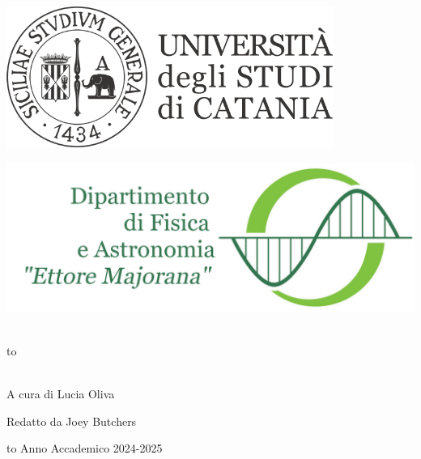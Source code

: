 \documentclass[openany,12pt]{article}
\newcommand\blankpage{%
    \null
    \thispagestyle{empty}%
    \newpage} %
\begin{document}
\thispagestyle{empty}
\begin{center}

\begin{minipage}[c]{0.45\textwidth}
\begin{flushleft}
\includegraphics[width=0.8\textwidth]{logo-unict-orizzontale-grigio.png}
\end{flushleft}
\end{minipage}
\hfill
\begin{minipage}[c]{0.45\textwidth}
\begin{flushright}
\includegraphics[width=\textwidth]{logo_dfa_orizzontale}
\end{flushright}
\end{minipage}\\
\medskip
\hbox to \textwidth{\hrulefill}

\vfill
\vfill

\uppercase{}\\

\vfill
\large{A cura di Lucia Oliva}

\vfill
\large{Redatto da Joey Butchers}

\vfill
\vfill
\hbox to \textwidth{\hrulefill}
{\sc Anno Accademico 2024-2025}
\end{center}

\afterpage{\blankpage}
\newpage


\newpage
\end{document}
